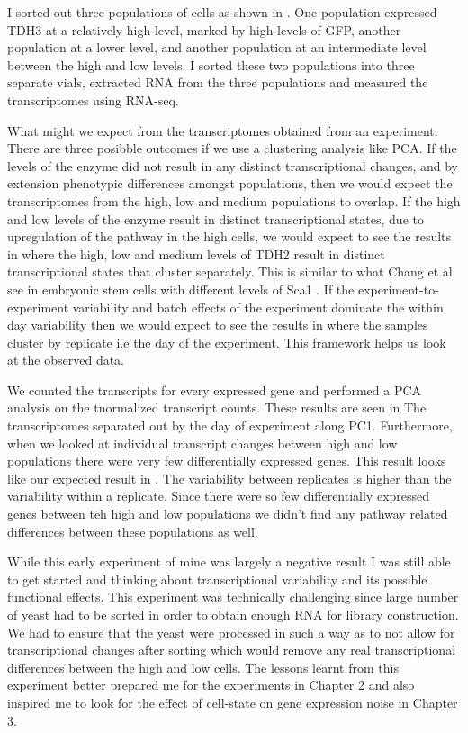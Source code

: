 I sorted out three populations of cells as shown in \cite{Figure_sorter}. One population expressed TDH3 at a relatively high level, marked by high levels of GFP, another population at a lower level, and another population at an intermediate level between the high and low levels.  I sorted these two populations into three separate vials, extracted RNA from the three populations and measured the transcriptomes using RNA-seq.

What might we expect from the transcriptomes obtained from an experiment. There are three posibble outcomes if we use a clustering analysis like PCA. If the levels of the enzyme did not result in any distinct transcriptional changes, and by extension phenotypic differences amongst populations, then we would expect the transcriptomes from the high, low and medium populations to overlap. If the high and low levels of the enzyme result in distinct transcriptional states, due to upregulation of the pathway in the high cells, we would expect to see the results in \cite{Figure 1B} where the high, low and medium levels of TDH2 result in distinct transcriptional states that cluster separately. This is similar to what Chang et al see in embryonic stem cells with different levels of Sca1 \cite{sui-huang}. If the experiment-to-experiment variability and batch effects of the experiment dominate the within day variability then we would expect to see the results in \cite{Figure 1C} where the samples cluster by replicate i.e the day of the experiment. This framework helps us look at the observed data.

We counted the transcripts for every expressed gene and performed a PCA analysis on the tnormalized transcript counts. These results are seen in \cite{FigurePCA} The transcriptomes separated out by the day of experiment along PC1. Furthermore, when we looked at individual transcript changes between high and low populations there were very few differentially expressed genes. This result looks like our expected result in \cite{Figure 1C}. The variability between replicates is higher than the variability within a replicate. Since there were so few differentially expressed genes between teh high and low populations we didn't find any pathway related differences between these populations as well.

While this early experiment of mine was largely a negative result I was still able to get started and thinking about transcriptional variability and its possible functional effects. This experiment was technically challenging since large number of yeast had to be sorted in order to obtain enough RNA for library construction. We had to ensure that the yeast were processed in such a way as to not allow for transcriptional changes after sorting which would remove any real transcriptional differences between the high and low cells. The lessons learnt from this experiment better prepared me for the experiments in Chapter 2 and also inspired me to look for the effect of cell-state on gene expression noise in Chapter 3.

